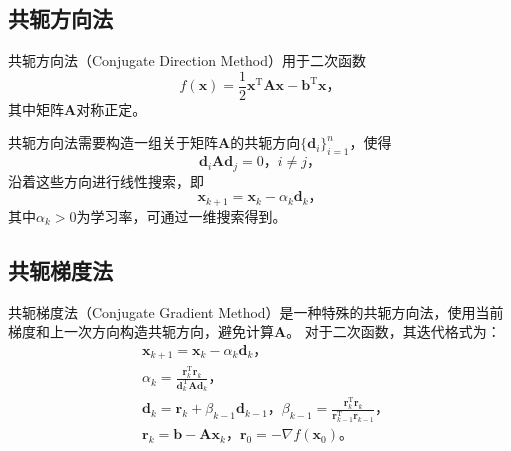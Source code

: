 \subsection{共轭方向法}

共轭方向法（Conjugate Direction Method）用于二次函数
\begin{equation*}
    f(\bm{x})=\frac{1}{2}\bm{x}^\mathrm{T}\bm{Ax}-\bm{b}^\mathrm{T}\bm{x} \text{，}
\end{equation*}
其中矩阵$\bm{A}$对称正定。

共轭方向法需要构造一组关于矩阵$\bm{A}$的共轭方向$\{\bm{d}_i\}_{i=1}^n$，使得
\begin{equation*}
    \bm{d}_i\bm{A}\bm{d}_j=0 \text{，} i\ne j \text{，}
\end{equation*}
沿着这些方向进行线性搜索，即
\begin{equation*}
    \bm{x}_{k+1}=\bm{x}_k-\alpha_k\bm{d}_k \text{，}
\end{equation*}
其中$\alpha_k>0$为学习率，可通过一维搜索得到。

\subsection{共轭梯度法}

共轭梯度法（Conjugate Gradient Method）是一种特殊的共轭方向法，使用当前梯度和上一次方向构造共轭方向，避免计算$\bm{A}$。
对于二次函数，其迭代格式为：
\begin{align*}
    &\bm{x}_{k+1}=\bm{x}_k-\alpha_k\bm{d}_k \text{，} \\
    &\alpha_k=\frac{\bm{r}_k^\mathrm{T}\bm{r}_k}{\bm{d}_k^\mathrm{T}\bm{Ad}_k} \text{，} \\
    &\bm{d}_k=\bm{r}_k+\beta_{k-1}\bm{d}_{k-1} \text{，} \beta_{k-1}=\frac{\bm{r}_k^\mathrm{T}\bm{r}_k}{\bm{r}_{k-1}^\mathrm{T}\bm{r}_{k-1}} \text{，} \\
    &\bm{r}_k=\bm{b}-\bm{Ax}_k \text{，} \bm{r}_0=-\nabla f(\bm{x}_0) \text{。}
\end{align*}
